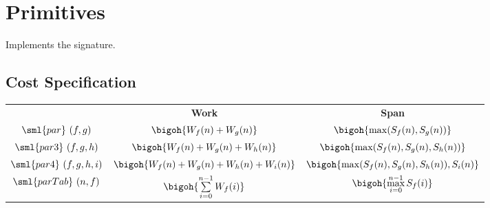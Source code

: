 \chapter{Primitives}
\label{ch:primitives}

\begin{preamble}
Implements the  signature.
\end{preamble}

\section{Cost Specification}
\begin{costspec}
\begin{tabular}{ccc}
  & \textbf{Work} & \textbf{Span} \\
$\sml{par}~(f,g)$ & $\bigoh{W_f(n) + W_g(n)}$ & $\bigoh{\max(S_f(n), S_g(n))}$ \\
$\sml{par3}~(f,g,h)$ & $\bigoh{W_f(n) + W_g(n) + W_h(n)}$ & $\bigoh{\max(S_f(n), S_g(n), S_h(n))}$ \\
$\sml{par4}~(f,g,h,i)$ & $\bigoh{W_f(n) + W_g(n) + W_h(n) + W_i(n)}$ & $\bigoh{\max(S_f(n), S_g(n), S_h(n)), S_i(n)}$ \\
$\sml{parTab}~(n,f)$ & $\bigoh{\sum\limits_{i=0}^{n-1} W_f(i)}$ & $\bigoh{\max\limits_{i=0}^{n-1} S_f(i)}$
\end{tabular}
\end{costspec}